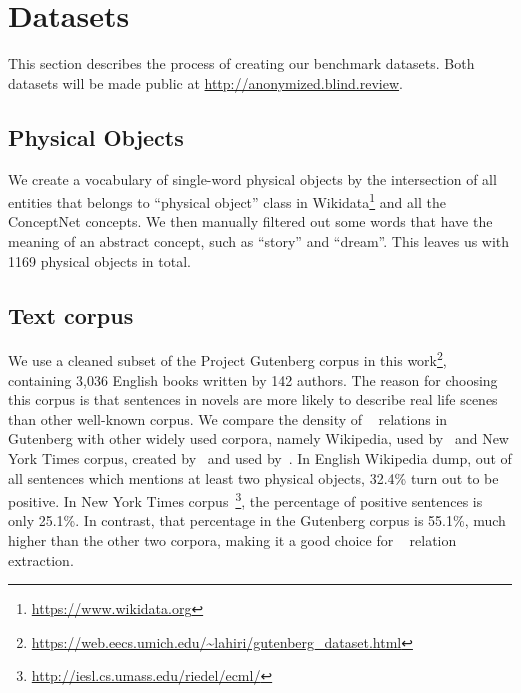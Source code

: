 \section{Datasets}
\label{sec:data}

This section describes the process of creating our benchmark datasets.
Both datasets will be made public at 
\url{http://anonymized.blind.review}.

\subsection{Physical Objects}
We create a vocabulary of single-word physical objects by the 
intersection of all entities that belongs to ``physical object'' class
in Wikidata\footnote{\url{https://www.wikidata.org}} and 
all the ConceptNet concepts. We then manually filtered out some 
words that have the meaning of an abstract concept, 
such as ``story'' and ``dream''. This leaves us with
1169 physical objects in total.

\subsection{Text corpus}
We use a cleaned subset of the Project Gutenberg corpus \cite{lahiri:2014:SRW} 
in this work\footnote{\url{https://web.eecs.umich.edu/~lahiri/gutenberg_dataset.html}}, containing 3,036 English books written by 142 authors.
The reason for choosing this corpus is that sentences in novels are 
more likely to describe real life scenes than other well-known corpus. 
We compare the density of \lnear~ relations in Gutenberg with other 
widely used corpora, namely Wikipedia, 
used by~\citeauthor{mintz2009distant} and New York Times corpus, 
created by~\citeauthor{riedel2010modeling} and 
used by~\citeauthor{Lin2016NeuralRE,hoffmann2011knowledge,surdeanu2012multi}. 
In English Wikipedia dump, out of all sentences which mentions at least two
physical objects, 32.4\% turn out to be positive. 
In New York Times corpus~\footnote{\url{http://iesl.cs.umass.edu/riedel/ecml/}},
the percentage of positive sentences is only 25.1\%. 
In contrast, that percentage in the Gutenberg corpus is 55.1\%, much higher 
than the other two corpora, making it a good choice for \lnear~ 
relation extraction.

